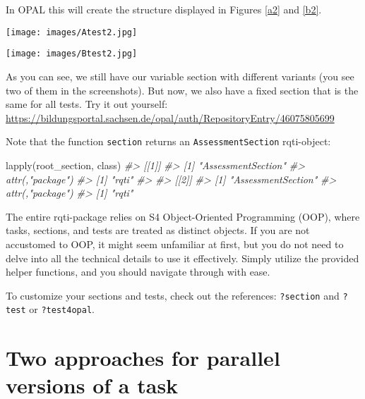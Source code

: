 \documentclass[twoside]{tufte-book}
\newenvironment{Shaded}{}{}
\newcommand{\CommentTok}[1]{\textcolor[rgb]{0.38,0.63,0.69}{\textit{#1}}}
\newcommand{\FunctionTok}[1]{\textcolor[rgb]{0.02,0.16,0.49}{#1}}
\newcommand{\NormalTok}[1]{#1}
\begin{document}
In OPAL this will create the structure displayed in Figures \ref{a2} and \ref{b2}.

\begin{figure*}
\centering
\texttt{[image: images/Atest2.jpg]}
\caption{\label{a2}Test structure with one fixed section, seed 9808.}
\end{figure*}

\begin{figure*}
\centering
\texttt{[image: images/Btest2.jpg]}
\caption{\label{b2}Test structure with one fixed section, for seed 8833.}
\end{figure*}

As you can see, we still have our variable section with different variants (you see two of them in the screenshots). But now, we also have a fixed section that is the same for all tests. Try it out yourself: \url{https://bildungsportal.sachsen.de/opal/auth/RepositoryEntry/46075805699}

Note that the function \texttt{section} returns an \texttt{AssessmentSection} rqti-object:

\begin{Shaded}
\begin{Highlighting}[]
\FunctionTok{lapply}\NormalTok{(root\_section, class)}
\CommentTok{\#\textgreater{} [[1]]}
\CommentTok{\#\textgreater{} [1] "AssessmentSection"}
\CommentTok{\#\textgreater{} attr(,"package")}
\CommentTok{\#\textgreater{} [1] "rqti"}
\CommentTok{\#\textgreater{} }
\CommentTok{\#\textgreater{} [[2]]}
\CommentTok{\#\textgreater{} [1] "AssessmentSection"}
\CommentTok{\#\textgreater{} attr(,"package")}
\CommentTok{\#\textgreater{} [1] "rqti"}
\end{Highlighting}
\end{Shaded}

The entire rqti-package relies on S4 Object-Oriented Programming (OOP), where tasks, sections, and tests are treated as distinct objects. If you are not accustomed to OOP, it might seem unfamiliar at first, but you do not need to delve into all the technical details to use it effectively. Simply utilize the provided helper functions, and you should navigate through with ease.

To customize your sections and tests, check out the references: \texttt{?section} and \texttt{?test} or \texttt{?test4opal}.

\section{Two approaches for parallel versions of a task}\label{two-approaches-for-parallel-versions-of-a-task}
\end{document}
